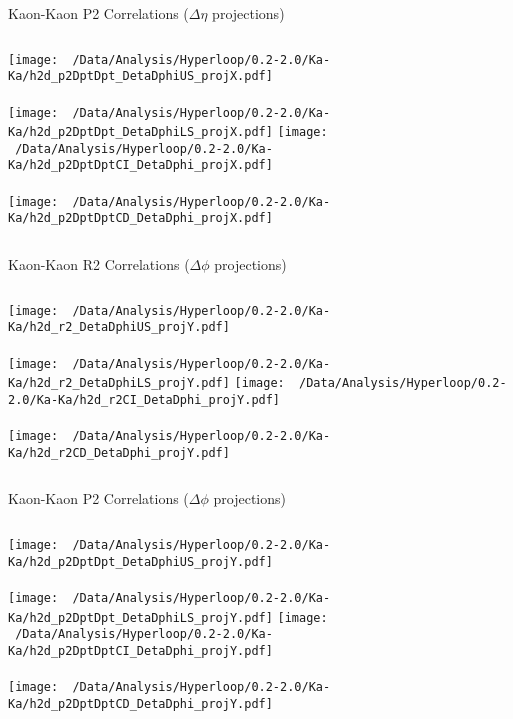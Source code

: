 \documentclass{beamer}
\begin{document}
\begin{frame}{Kaon-Kaon P2 Correlations ($\Delta\eta$ projections)}
	\begin{columns}
		\centering
		\texttt{[image: ~/Data/Analysis/Hyperloop/0.2-2.0/Ka-Ka/h2d\_p2DptDpt\_DetaDphiUS\_projX.pdf]}\\~\\
		\texttt{[image: ~/Data/Analysis/Hyperloop/0.2-2.0/Ka-Ka/h2d\_p2DptDpt\_DetaDphiLS\_projX.pdf]}
		\centering
		\texttt{[image: ~/Data/Analysis/Hyperloop/0.2-2.0/Ka-Ka/h2d\_p2DptDptCI\_DetaDphi\_projX.pdf]}\\~\\
		\texttt{[image: ~/Data/Analysis/Hyperloop/0.2-2.0/Ka-Ka/h2d\_p2DptDptCD\_DetaDphi\_projX.pdf]}
	\end{columns}
\end{frame}
\begin{frame}{Kaon-Kaon R2 Correlations ($\Delta\phi$ projections)}
	\begin{columns}
		\column{0.5\linewidth}
		\centering
		\texttt{[image: ~/Data/Analysis/Hyperloop/0.2-2.0/Ka-Ka/h2d\_r2\_DetaDphiUS\_projY.pdf]}\\~\\
		\texttt{[image: ~/Data/Analysis/Hyperloop/0.2-2.0/Ka-Ka/h2d\_r2\_DetaDphiLS\_projY.pdf]}
		\column{0.5\linewidth}
		\centering
		\texttt{[image: ~/Data/Analysis/Hyperloop/0.2-2.0/Ka-Ka/h2d\_r2CI\_DetaDphi\_projY.pdf]}\\~\\
		\texttt{[image: ~/Data/Analysis/Hyperloop/0.2-2.0/Ka-Ka/h2d\_r2CD\_DetaDphi\_projY.pdf]}
	\end{columns}
\end{frame}
\begin{frame}{Kaon-Kaon P2 Correlations ($\Delta\phi$ projections)}
	\begin{columns}
		\centering
		\texttt{[image: ~/Data/Analysis/Hyperloop/0.2-2.0/Ka-Ka/h2d\_p2DptDpt\_DetaDphiUS\_projY.pdf]}\\~\\
		\texttt{[image: ~/Data/Analysis/Hyperloop/0.2-2.0/Ka-Ka/h2d\_p2DptDpt\_DetaDphiLS\_projY.pdf]}
		\centering
		\texttt{[image: ~/Data/Analysis/Hyperloop/0.2-2.0/Ka-Ka/h2d\_p2DptDptCI\_DetaDphi\_projY.pdf]}\\~\\
		\texttt{[image: ~/Data/Analysis/Hyperloop/0.2-2.0/Ka-Ka/h2d\_p2DptDptCD\_DetaDphi\_projY.pdf]}
	\end{columns}
\end{frame}
\end{document}
